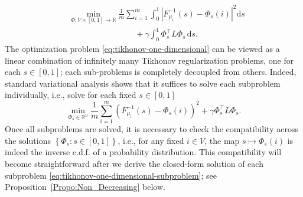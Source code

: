 \documentclass[letterpaper]{article} %
\begin{document}
\begin{equation}\label{eq:tikhonov-one-dimensional}
  \begin{aligned}
      &\min_{\Phi:V\times \left[ 0,1 \right]\rightarrow \mathbb{R}}\frac{1}{m}\sum_{i=1}^m\int_0^1 \left| F_{\mu_i}^{-1}\left( s \right)-\Phi_s \left( i \right) \right|^2\mathrm{d}s\\
      &\qquad \qquad\qquad \qquad +\gamma\int_0^1\Phi_s^{\top}L\Phi_s\,\mathrm{d}s.
  \end{aligned}
\end{equation}
The optimization problem \eqref{eq:tikhonov-one-dimensional} can be viewed as a linear combination of infinitely many Tikhonov regularization problems, one for each $s\in \left[ 0,1 \right]$; each sub-problems is completely decoupled from others. Indeed, standard variational analysis shows that it suffices to solve each subproblem individually, i.e., solve for each fixed $s\in  \left[ 0,1 \right]$
\begin{equation}
  \label{eq:tikhonov-one-dimensional-subproblem}
  \min_{\Phi_s\in\mathbb{R}^n}\frac{1}{m}\sum_{i=1}^m \left( F_{\mu_i}^{-1}\left( s \right)-\Phi_s \left( i \right) \right)^2+\gamma \Phi_s^{\top}L\Phi_s.
\end{equation}
Once all subproblems are solved, it is necessary to check the compatibility across the solutions $\left\{\Phi_s:s\in \left[ 0,1 \right]\right\}$, i.e., for any fixed $i\in V$, the map $s\mapsto \Phi_s \left( i \right)$ is indeed the inverse c.d.f. of a probability distribution. This compatibility will become straightforward after we derive the closed-form solution of each subproblem \eqref{eq:tikhonov-one-dimensional-subproblem}; see Proposition~\ref{Propo:Non_Decreasing} below.
\end{document}
